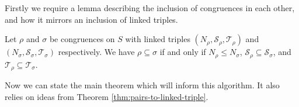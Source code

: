 Firstly we require a lemma describing the inclusion of congruences in each
other, and how it mirrors an inclusion of linked triples.

\begin{lemma}
  \label{lem:linked-triple-subsets}
  Let $\rho$ and $\sigma$ be congruences on $S$ with linked triples
  $(N_\rho, \mathcal{S}_\rho, \mathcal{T}_\rho)$ and
  $(N_\sigma, \mathcal{S}_\sigma, \mathcal{T}_\sigma)$ respectively.
  We have $\rho \subseteq \sigma$ if and only if
  $N_\rho \leq N_\sigma$,
  $\mathcal{S}_\rho \subseteq \mathcal{S}_\sigma$, and
  $\mathcal{T}_\rho \subseteq \mathcal{T}_\sigma$.
\end{lemma}

Now we can state the main theorem which will inform this algorithm.  It also
relies on ideas from Theorem \ref{thm:pairs-to-linked-triple}.

